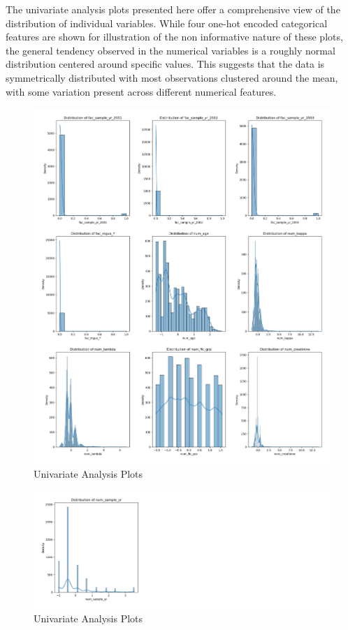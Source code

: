 \noindent The univariate analysis plots presented here offer a comprehensive view of the distribution of individual variables. While four one-hot encoded categorical features are shown for illustration of the non informative nature of these plots, the general tendency observed in the numerical variables is a roughly normal distribution centered around specific values. This suggests that the data is symmetrically distributed with most observations clustered around the mean, with some variation present across different numerical features.
\begin{figure}[h]
    \centering
    \includegraphics[scale=0.21]{Figures/EDA/uni3.png}
    \caption{Univariate Analysis Plots}
    \label{fig:uni1}
\end{figure}


\begin{figure}[h]
    \centering
    \includegraphics[scale=0.21]{Figures/EDA/uni4.png}
    \caption{Univariate Analysis Plots}
    \label{fig:uni2}
\end{figure}


